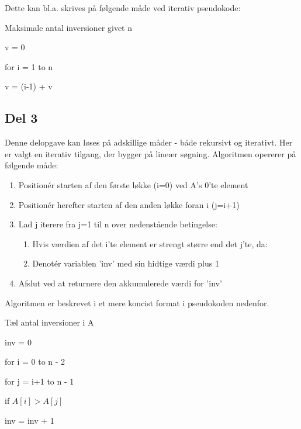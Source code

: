 \documentclass[a4paper,10pt]{article}
\begin{document}
Dette kan bl.a. skrives på følgende måde ved iterativ pseudokode:

\begin{algorithm}
\caption{Maksimale antal inversioner givet n}
\begin{algorithmic}[1]
\State \parbox[t]{.7\linewidth}{v = 0}
\State \parbox[t]{.7\linewidth}{for i = 1 to n}
\Indent
\State \parbox[t]{.7\linewidth}{v = (i-1) + v}
\EndIndent
\State {}
\EndFunction
\end{algorithmic}
\end{algorithm}

\subsection*{Del 3}

Denne delopgave kan løses på adskillige måder - både rekursivt og iterativt. Her er valgt en iterativ tilgang, der bygger på lineær søgning. Algoritmen opererer på følgende måde:

\begin{enumerate}
\item{Positionér starten af den første løkke (i=0) ved A's 0'te element}
\item{Positionér herefter starten af den anden løkke foran i (j=i+1)}
\item{Lad j iterere fra j=1 til n over nedenstående betingelse:}
\begin{enumerate}
\item{Hvis værdien af det i'te element er strengt større end det j'te, da:}
\item{Denotér variablen 'inv' med sin hidtige værdi plus 1}
\end{enumerate}
\item{Afslut ved at returnere den akkumulerede værdi for 'inv'}
\end{enumerate}

Algoritmen er beskrevet i et mere koncist format i pseudokoden nedenfor. 

\begin{algorithm}[H]
\caption{Tæl antal inversioner i A}
\begin{algorithmic}[2]
\State \parbox[t]{.7\linewidth}{inv = 0}
\State \parbox[t]{.7\linewidth}{for i = 0 to n - 2}
\Indent
\State \parbox[t]{.7\linewidth}{for j = i+1 to n - 1}
\Indent
\State \parbox[t]{.7\linewidth}{if $A[i] > A[j]$}
\State \parbox[t]{.7\linewidth}{inv = inv + 1}
\EndIndent
\EndIndent
\State {}
\EndFunction
\end{algorithmic}
\end{algorithm}
\end{document}
